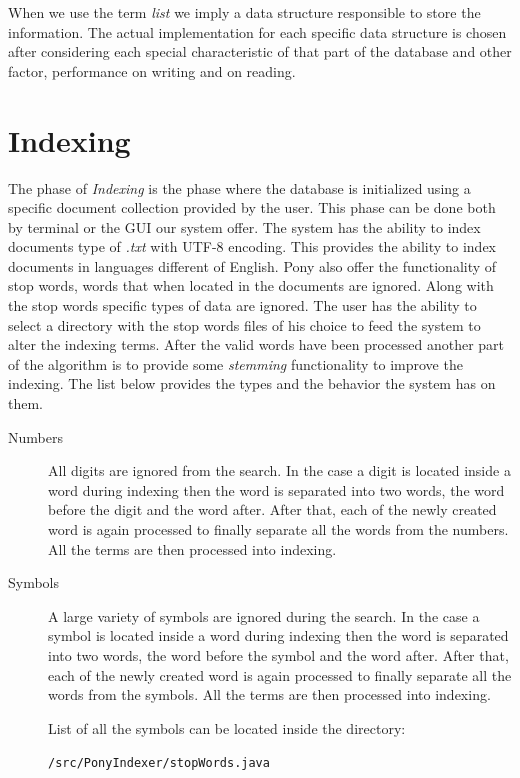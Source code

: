 \documentclass[letterpaper,10pt]{article}
\begin{document}
When we use the term \emph{ list} we imply a data structure responsible to store the information. The actual implementation for each specific data structure is chosen after considering each special characteristic of that part of the database and other factor, performance on writing and on reading.

\section{Indexing}
The phase of \emph{ Indexing} is the phase where the database is initialized using a specific document collection provided by the user. This phase can be done both by terminal or the GUI our system offer. The system has the ability to index documents type of {\it .txt} with UTF-8 encoding. This provides the ability to index documents in languages different of English. Pony also offer the functionality of stop words, words that when located in the documents are ignored. Along with the stop words specific types of data are ignored. The user has the ability to select a directory with the stop words files of his choice to feed the system to alter the indexing terms. After the valid words have been processed another part of the algorithm is to provide some \emph{ stemming} functionality to improve the indexing. The list below provides the types and the behavior the system has on them.

\begin{description}
  \item[Numbers] All digits are ignored from the search. In the case a digit is located inside a word during indexing then the word is separated into two words, the word before the digit and the word after. After that, each of the newly created word is again processed to finally separate all the words from the numbers. All the terms are then processed into indexing.
  \item[Symbols] A large variety of symbols are ignored during the search. In the case a symbol is located inside a word during indexing then the word is separated into two words, the word before the symbol and the word after. After that, each of the newly created word is again processed to finally separate all the words from the symbols. All the terms are then processed into indexing.

  List of all the symbols can be located inside the directory: 

{\tt /src/PonyIndexer/stopWords.java}
\end{description}
\end{document}
